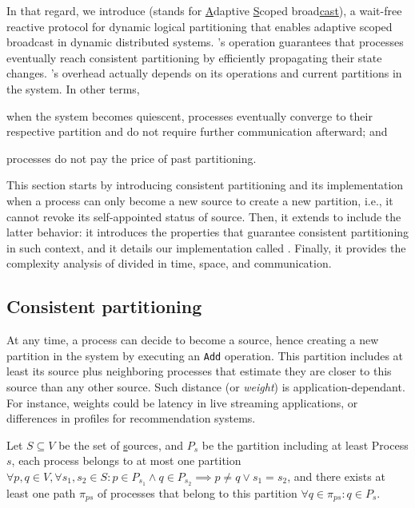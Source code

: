 \noindent In that regard, we introduce \NAME (stands for
\underline{A}daptive \underline{S}coped broad\underline{cast}), a
wait-free reactive protocol for dynamic logical partitioning that
enables adaptive scoped broadcast in dynamic distributed
systems. \NAME's operation guarantees that processes eventually reach
consistent partitioning by efficiently propagating their state
changes. \NAME's overhead actually depends on its operations and
current partitions in the system. In other terms,
\begin{inparaenum}[(i)]
\item when the system becomes quiescent, processes eventually converge to
their respective partition and do not require further communication
afterward; and
\item processes do not pay the price of past partitioning.
\end{inparaenum}

\noindent This section starts by introducing consistent partitioning
and its implementation when a process can only become a new source to
create a new partition, i.e., it cannot revoke its self-appointed
status of source. Then, it extends to include the latter behavior: it
introduces the properties that guarantee consistent partitioning in
such context, and it details our implementation called \NAME. Finally,
it provides the complexity analysis of \NAME divided in time, space,
and communication.


\subsection{Consistent partitioning}

At any time, a process can decide to become a source, hence creating a
new partition in the system by executing an \texttt{Add}
operation. This partition includes at least its source plus
neighboring processes that estimate they are closer to this source
than any other source. Such distance (or \emph{weight}) is
application-dependant. For instance, weights could be latency in live
streaming applications, or differences in profiles for recommendation
systems.

\begin{definition}
  Let $S \subseteq V$ be the set of \underline{s}ources, and $P_s$ be
  the \underline{p}artition including at least Process $s$, each
  process belongs to at most one partition $\forall p,q \in V, \forall
  s_1,s_2 \in S: p \in P_{s_1} \wedge q \in P_{s_2} \implies p \neq q
  \vee s_1 = s_2$, and there exists at least one path $\pi_{ps}$ of
  processes that belong to this partition $\forall q \in \pi_{ps}: q
  \in P_s$.
\end{definition}

